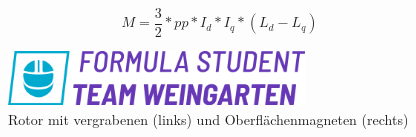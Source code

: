 \begin{formel}
    \begin{equation}
        \label{eq:Moment-L}
        M = \frac{3}{2} * pp * I_d * I_q * (L_d - L_q)
    \end{equation}
    \caption[Drehmomentgleichung mit Induktivität]{}
\end{formel}

\vspace{-0.8cm}

\blindtext{}

\vspace{0.3cm}

\begin{figure}[h]
    \centering
    \includegraphics[width=0.7\textwidth]{media/pic.png}
    \caption{Rotor mit vergrabenen (links) und Oberflächenmagneten (rechts)~\cite[S. 370]{schroederElektrischeAntriebeGrundlagen2021}}
    \label{fig:Magnete}
\end{figure}

\newpage{}
\blindtext{}